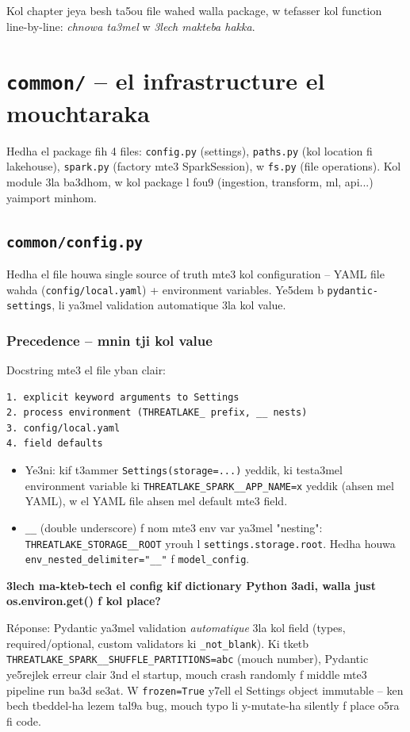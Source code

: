 \documentclass[11pt,a4paper]{report}
\DeclareRobustCommand{\code}[1]{\texttt{#1}}
\DeclareRobustCommand{\file}[1]{\texttt{\color{amber}#1}}
\begin{document}
Kol chapter jeya besh ta5ou file wahed walla package, w tefasser kol function
line-by-line: \emph{chnowa ta3mel} w \emph{3lech makteba hakka}.

\chapter{\file{common/} -- el infrastructure el mouchtaraka}

Hedha el package fih 4 files: \code{config.py} (settings), \code{paths.py}
(kol location fi lakehouse), \code{spark.py} (factory mte3 SparkSession), w
\code{fs.py} (file operations). Kol module 3la ba3dhom, w kol package l fou9
(ingestion, transform, ml, api...) ya\-import minhom.

\section{\file{common/config.py}}

Hedha el file houwa single source of truth mte3 kol configuration -- YAML file
wahda (\code{config/local.yaml}) + environment variables. Ye5dem b
\code{pydantic-settings}, li ya3mel validation automatique 3la kol value.

\subsection{Precedence -- mnin tji kol value}

Docstring mte3 el file yban clair:

\begin{lstlisting}[style=pystyle]
1. explicit keyword arguments to Settings
2. process environment (THREATLAKE_ prefix, __ nests)
3. config/local.yaml
4. field defaults
\end{lstlisting}

\begin{itemize}
  \item Ye3ni: kif t3ammer \code{Settings(storage=...)} yeddik, ki testa3mel
        environment variable ki \verb|THREATLAKE_SPARK__APP_NAME=x| yeddik
        (ahsen mel YAML), w el YAML file ahsen mel default mte3 field.
  \item \code{\_\_} (double underscore) f nom mte3 env var ya3mel "nesting":
        \verb|THREATLAKE_STORAGE__ROOT| yrouh l \code{settings.storage.root}.
        Hedha houwa \code{env\_nested\_delimiter="\_\_"} f \code{model\_config}.
\end{itemize}

\begin{soual}
\textbf{3lech ma-kteb-tech el config kif dictionary Python 3adi, walla just
os.environ.get() f kol place?}

Réponse: Pydantic ya3mel validation \emph{automatique} 3la kol field (types,
required/optional, custom validators ki \code{\_not\_blank}). Ki tketb
\code{THREATLAKE\_SPARK\_\_SHUFFLE\_PARTITIONS=abc} (mouch number), Pydantic
ye5rejlek erreur clair 3nd el startup, mouch crash randomly f middle mte3
pipeline run ba3d se3at. W \code{frozen=True} y7ell el Settings object immutable
-- ken bech tbeddel-ha lezem tal9a bug, mouch typo li y-mutate-ha silently f
place o5ra fi code.
\end{soual}
\end{document}
